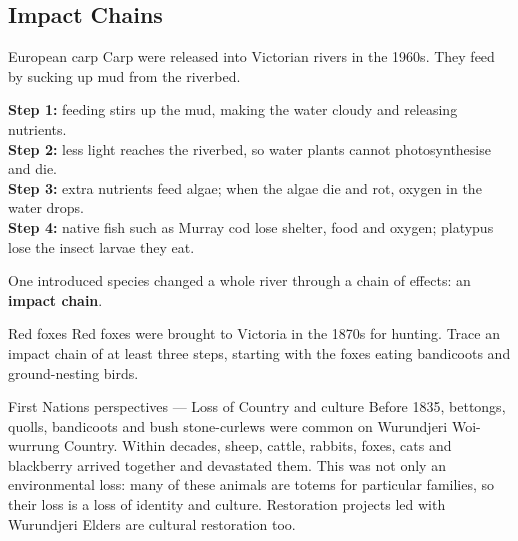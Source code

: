 \subsection{Impact Chains}\label{sub:9.2}

\begin{workedex}{European carp}
Carp were released into Victorian rivers in the 1960s. They feed by sucking up mud from the riverbed.

\smallskip
\textbf{Step 1:} feeding stirs up the mud, making the water cloudy and releasing nutrients.\\
\textbf{Step 2:} less light reaches the riverbed, so water plants cannot photosynthesise and die.\\
\textbf{Step 3:} extra nutrients feed algae; when the algae die and rot, oxygen in the water drops.\\
\textbf{Step 4:} native fish such as Murray cod lose shelter, food and oxygen; platypus lose the insect larvae they eat.

\smallskip
One introduced species changed a whole river through a chain of effects: an \textbf{impact chain}.
\end{workedex}

\begin{wedo}{Red foxes}
Red foxes were brought to Victoria in the 1870s for hunting. Trace an impact chain of at least three steps, starting with the foxes eating bandicoots and ground-nesting birds.
\answerbox{5cm}
\end{wedo}

\begin{countrybox}{First Nations perspectives --- Loss of Country and culture}
Before 1835, bettongs, quolls, bandicoots and bush stone-curlews were common on Wurundjeri Woi-wurrung Country. Within decades, sheep, cattle, rabbits, foxes, cats and blackberry arrived together and devastated them. This was not only an environmental loss: many of these animals are totems for particular families, so their loss is a loss of identity and culture. Restoration projects led with Wurundjeri Elders are cultural restoration too.
\end{countrybox}

\label{prac:9}

